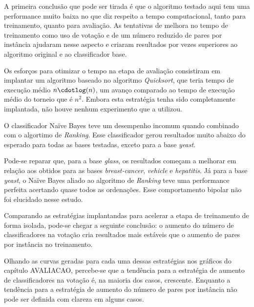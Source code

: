 A primeira conclusão que pode ser tirada é que o algoritmo testado aqui tem uma performance muito baixa no que diz respeito a tempo computacional, tanto para treinamento, quanto para avaliação. As tentativas de melhora no tempo de treinamento como uso de votação e de um número reduzido de pares por instância ajudaram nesse aspecto e criaram resultados por vezes superiores ao algoritmo original e ao classificador base.

Os esforços para otimizar o tempo na etapa de avaliação consistiram em implantar um algoritmo baseado no algoritmo \emph{Quicksort}, que teria tempo de execução médio $n\cdotlog(n)$, um avanço comparado ao tempo de execução médio do torneio que é $n^2$. Embora esta estratégia tenha sido completamente implantada, não houve nenhum experimento que a utilizou.

O classificador Naïve Bayes teve um desempenho incomum quando combinado com o algortimo de \emph{Ranking}. Esse classificador gerou resultados muito abaixo do esperado para todas as bases testadas, exceto para a base \emph{yeast}.

Pode-se reparar que, para a base \emph{glass}, os resultados começam a melhorar em relação aos obtidos para as bases \emph{breast-cancer}, \emph{vehicle} e \emph{hepatitis}. Já para a base \emph{yeast}, o Naïve Bayes aliado ao algoritmo de \emph{Ranking} teve uma performance perfeita acertando quase todos as ordenações. Esse comportamento bipolar não foi elucidado nesse estudo.

Comparando as estratégias implantandas para acelerar a etapa de treinamento de forma isolada, pode-se chegar a seguinte conclusão: o aumento do número de classificadores na votação cria resultados mais estáveis que o aumento de pares por instância no treinamento.

Olhando as curvas geradas para cada uma dessas estratégias nos gráficos do capítulo {{AVALIACAO}}, percebe-se que a tendência para a estratégia de aumento de classificadores na votação é, na maioria dos casos, crescente. Enquanto a tendência para a estratégia de aumento do número de pares por instância não pode ser definida com clareza em alguns casos.
